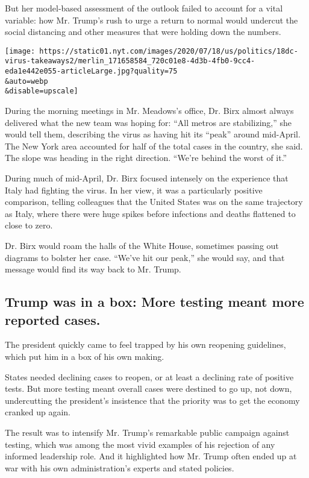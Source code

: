 But her model-based assessment of the outlook failed to account for a
vital variable: how Mr. Trump's rush to urge a return to normal would
undercut the social distancing and other measures that were holding down
the numbers.

\texttt{[image: https://static01.nyt.com/images/2020/07/18/us/politics/18dc-virus-takeaways2/merlin\_171658584\_720c01e8-4d3b-4fb0-9cc4-eda1e442e055-articleLarge.jpg?quality=75\\\&auto=webp\\\&disable=upscale]}

During the morning meetings in Mr. Meadows's office, Dr. Birx almost
always delivered what the new team was hoping for: ``All metros are
stabilizing,'' she would tell them, describing the virus as having hit
its ``peak'' around mid-April. The New York area accounted for half of
the total cases in the country, she said. The slope was heading in the
right direction. ``We're behind the worst of it.''

During much of mid-April, Dr. Birx focused intensely on the experience
that Italy had fighting the virus. In her view, it was a particularly
positive comparison, telling colleagues that the United States was on
the same trajectory as Italy, where there were huge spikes before
infections and deaths flattened to close to zero.

Dr. Birx would roam the halls of the White House, sometimes passing out
diagrams to bolster her case. ``We've hit our peak,'' she would say, and
that message would find its way back to Mr. Trump.

\hypertarget{trump-was-in-a-box-more-testing-meant-more-reported-cases}{%
\subsection{Trump was in a box: More testing meant more reported
cases.}\label{trump-was-in-a-box-more-testing-meant-more-reported-cases}}

The president quickly came to feel trapped by his own reopening
guidelines, which put him in a box of his own making.

States needed declining cases to reopen, or at least a declining rate of
positive tests. But more testing meant overall cases were destined to go
up, not down, undercutting the president's insistence that the priority
was to get the economy cranked up again.

The result was to intensify Mr. Trump's remarkable public campaign
against testing, which was among the most vivid examples of his
rejection of any informed leadership role. And it highlighted how Mr.
Trump often ended up at war with his own administration's experts and
stated policies.

